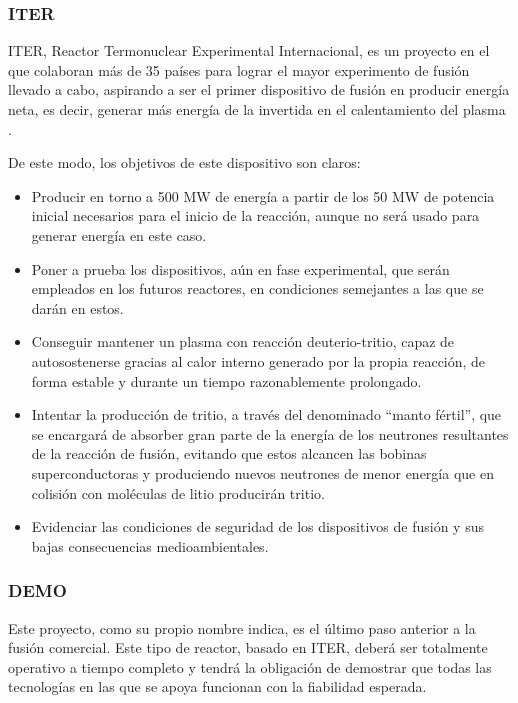 \subsubsection{ITER}

ITER,  Reactor Termonuclear Experimental Internacional, es un proyecto en el que colaboran más de 35 países para lograr el mayor experimento de fusión llevado a cabo, aspirando a ser el primer dispositivo de fusión en producir energía neta, es decir, generar más energía de la invertida en el calentamiento del plasma \cite{47}.

De este modo, los objetivos de este dispositivo son claros:

\begin{itemize}
    \item Producir en torno a 500 MW de energía a partir de los 50 MW de potencia inicial necesarios para el inicio de la reacción, aunque no será usado para generar energía en este caso.
    
    \item Poner a prueba los dispositivos, aún en fase experimental, que serán empleados en los futuros reactores, en condiciones semejantes a las que se darán en estos.
    
    \item Conseguir mantener un plasma con reacción deuterio-tritio, capaz de autosostenerse gracias al calor interno generado por la propia reacción, de forma estable y durante un tiempo razonablemente prolongado.
    
    \item Intentar la producción de tritio, a través del denominado “manto fértil”, que se encargará de absorber  gran parte de la energía de los neutrones resultantes de la reacción de fusión, evitando que estos alcancen las bobinas superconductoras y produciendo nuevos neutrones de menor energía que en colisión con moléculas de litio producirán tritio.
    
    \item Evidenciar las condiciones de seguridad de los dispositivos de fusión y sus bajas consecuencias medioambientales.
\end{itemize}

\subsubsection{DEMO} 

Este proyecto, como su propio nombre indica, es el último paso anterior a la fusión comercial. Este tipo de reactor, basado en ITER, deberá ser totalmente operativo a tiempo completo y  tendrá la obligación de demostrar que todas las tecnologías en las que se apoya funcionan con la fiabilidad esperada.

